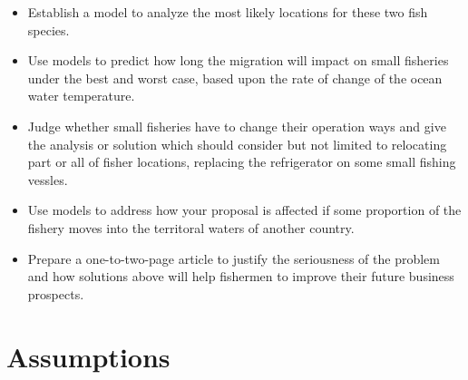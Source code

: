 \documentclass{mcmthesis}
\begin{document}
\begin{itemize}
\item Establish a model to analyze the most likely locations for these two fish species.
\item Use models to predict how long the migration will impact on small fisheries under the best and worst case, based upon the rate of change of the ocean water temperature.
\item Judge whether small fisheries have to change their operation ways and give the analysis or solution which should consider but not limited to relocating part or all of fisher locations, replacing the refrigerator on some small fishing vessles.
\item Use models to address how your proposal is affected if some proportion of the fishery moves into the territoral waters of another country.
\item Prepare a one-to-two-page article to justify the seriousness of the problem and how solutions above will help fishermen to improve their future business prospects.
\end{itemize}






\section{Assumptions}
\end{document}
